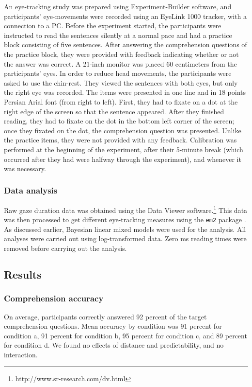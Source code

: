 \documentclass{frontiersSCNS}\usepackage{knitr} %
\begin{document}
An eye-tracking study was prepared using Experiment-Builder software, and participants' eye-movements were recorded using an EyeLink 1000 tracker, with a connection to a PC. Before the experiment started, the participants were instructed to read the sentences silently at a normal pace and had a practice block consisting of five sentences. After answering the comprehension questions of the practice block, they were provided with feedback indicating whether or not the answer was correct. A 21-inch monitor was placed 60 centimeters from the participants' eyes. In order to reduce head movements, the participants were asked to use the chin-rest. They viewed the sentences with both eyes, but only the right eye was recorded. The items were presented in one line and in 18 points Persian Arial font (from right to left). First, they had to fixate on a dot at the right edge of the screen so that the sentence appeared. After they finished reading, they had to fixate on the dot in the bottom left corner of the screen; once they fixated on the dot,  the comprehension question was presented. Unlike the practice items, they were not provided with any feedback. Calibration was performed at the beginning of the experiment, after their 5-minute break (which occurred after they had were halfway through the experiment), and whenever it was necessary.

\subsubsection{Data analysis}
Raw gaze duration data was obtained using the Data Viewer software.\footnote{http://www.sr-research.com/dv.html} This data was then processed to get different eye-tracking measures using the \texttt{em2} package \citep{logacev2014}. As discussed earlier, Bayesian linear mixed models  were used for the analysis. All analyses were carried out using log-transformed data.  Zero ms reading times were removed before carrying out the analysis.



\subsection{Results}
\subsubsection{Comprehension accuracy}



On average, participants correctly answered  92 percent of the target comprehension questions. Mean accuracy by condition was  
91
percent  
for condition a, 
91
percent for condition b, 
95
percent for condition c, and 
89
percent for condition d. We found no effects of 
distance and predictability, and no interaction.
\end{document}
